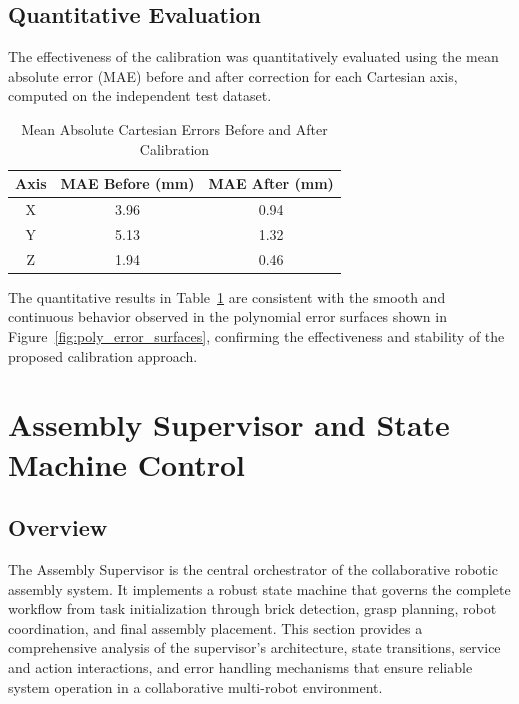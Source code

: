 
\subsection{Quantitative Evaluation}


The effectiveness of the calibration was quantitatively evaluated using the mean absolute error (MAE) before and after correction for each Cartesian axis, computed on the independent test dataset.

\begin{table}[H]
\centering
\caption{Mean Absolute Cartesian Errors Before and After Calibration}
\label{tab:mae_results}
\renewcommand{\arraystretch}{1.2}
\begin{tabular}{|c|c|c|}
\hline
\textbf{Axis} & \textbf{MAE Before (mm)} & \textbf{MAE After (mm)} \\ \hline
X & 3.96 & 0.94 \\ \hline
Y & 5.13 & 1.32 \\ \hline
Z & 1.94 & 0.46 \\ \hline
\end{tabular}
\end{table}

The quantitative results in Table~\ref{tab:mae_results} are consistent with the smooth and continuous behavior observed in the polynomial error surfaces shown in Figure~\ref{fig:poly_error_surfaces}, confirming the effectiveness and stability of the proposed calibration approach.
\section{Assembly Supervisor and State Machine Control}
\label{sec:supervisor}

\subsection{Overview}

The Assembly Supervisor is the central orchestrator of the collaborative robotic assembly system. It implements a robust state machine that governs the complete workflow from task initialization through brick detection, grasp planning, robot coordination, and final assembly placement. This section provides a comprehensive analysis of the supervisor's architecture, state transitions, service and action interactions, and error handling mechanisms that ensure reliable system operation in a collaborative multi-robot environment.

